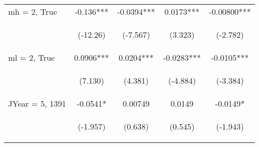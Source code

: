 \documentclass[]{standalone}
\begin{document}
\begin{tabular}{lcccc}
    mh = 2, True     & -0.136***                                      & -0.0394***                                     & 0.0173***                                      & -0.00800***                                    \\
    \vspace{4pt}     & \begin{footnotesize}(-12.26)\end{footnotesize} & \begin{footnotesize}(-7.567)\end{footnotesize} & \begin{footnotesize}(3.323)\end{footnotesize}  & \begin{footnotesize}(-2.782)\end{footnotesize} \\
    ml = 2, True     & 0.0906***                                      & 0.0204***                                      & -0.0283***                                     & -0.0105***                                     \\
    \vspace{4pt}     & \begin{footnotesize}(7.130)\end{footnotesize}  & \begin{footnotesize}(4.381)\end{footnotesize}  & \begin{footnotesize}(-4.884)\end{footnotesize} & \begin{footnotesize}(-3.384)\end{footnotesize} \\
    JYear = 5, 1391  & -0.0541*                                       & 0.00749                                        & 0.0149                                         & -0.0149*                                       \\
    \vspace{4pt}     & \begin{footnotesize}(-1.957)\end{footnotesize} & \begin{footnotesize}(0.638)\end{footnotesize}  & \begin{footnotesize}(0.545)\end{footnotesize}  & \begin{footnotesize}(-1.943)\end{footnotesize} \\

\end{tabular}
\end{document}
